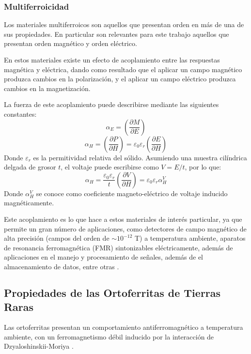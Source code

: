 \documentclass[../main.tex]{subfiles}
\begin{document}
\subsubsection{Multiferroicidad} \label{sec:multif}
Los materiales multiferroicos son aquellos que presentan orden en más de una de sus propiedades. En particular son relevantes para este trabajo aquellos que presentan orden magnético y orden eléctrico.

En estos materiales existe un efecto de acoplamiento entre las respuestas magnética y eléctrica, dando como resultado que el aplicar un campo magnético produzca cambios en la polarización, y el aplicar un campo eléctrico produzca cambios en la magnetización.

La fuerza de este acoplamiento puede describirse mediante las siguientes constantes:
\begin{equation}
    \alpha_E=\left(\dfrac{\partial M}{\partial E}\right)
    \label{eq:alphaE}
\end{equation}
\begin{equation}
    \alpha_H=\left(\dfrac{\partial P}{\partial H}\right)=\varepsilon_0\varepsilon_r\left(\dfrac{\partial E}{\partial H}\right)
    \label{eq:alphaH}
\end{equation}
Donde $\varepsilon_r$ es la permitividad relativa del sólido. Asumiendo una muestra cilíndrica delgada de grosor $t$, el voltaje puede escribirse como $V=E/t$, por lo que:
\begin{equation}
    \alpha_H=\dfrac{\varepsilon_0\varepsilon_r}{t}\left(\dfrac{\partial V}{\partial H}\right)=\varepsilon_0\varepsilon_r\alpha_H^V
    \label{eq:alphaHV}
\end{equation}
Donde $\alpha_H^V$ se conoce como coeficiente  magneto-eléctrico de voltaje inducido magnéticamente.

Este acoplamiento es lo que hace a estos materiales de interés particular, ya que permite un gran número de aplicaciones, como detectores de campo magnético de alta precisión (campos del orden de $\sim10^{-12}$ T) a temperatura ambiente, aparatos de resonancia ferromagnética (FMR) sintonizables eléctricamente, además de aplicaciones en el manejo y procesamiento de señales, además de el almacenamiento de datos, entre otras \cite{Vopson2015}.
\subsection{Propiedades de las Ortoferritas de Tierras Raras}
Las ortoferritas  presentan un comportamiento antiferromagnético a temperatura ambiente, con un ferromagnetismo débil inducido por la interacción de Dzyaloshinskii-Moriya \cite{KamalWarshi2018}.
\end{document}
